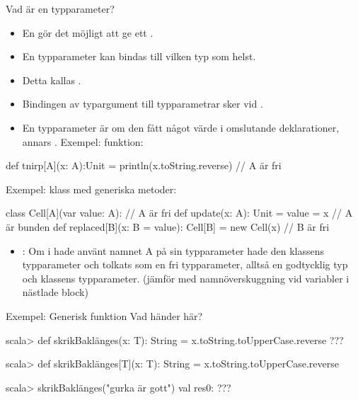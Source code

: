 \begin{Slide}{Vad är en typparameter?}\SlideFontSmall
  \setlength{\leftmargini}{0pt}

\begin{itemize}
\item En  gör det möjligt att ge ett .
\item En  typparameter kan bindas till vilken typ som helst.
\item Detta kallas  .
\item Bindingen av typargument till typparametrar sker vid .
\item En typparameter är  om den  fått något värde i omslutande deklarationer, annars . Exempel:  funktion:
\end{itemize}
\begin{Code}
def tnirp[A](x: A):Unit = println(x.toString.reverse) // A är fri
\end{Code}
\pause
Exempel:  klass med generiska metoder:
\begin{Code}
class Cell[A](var value: A):                            // A är fri
  def update(x: A): Unit = value = x                    // A är bunden
  def replaced[B](x: B = value): Cell[B] = new Cell(x)  // B är fri
\end{Code}
\pause
\begin{itemize}
\item {}: Om  i  hade använt namnet A på sin typparameter hade den  klassens typparameter och tolkats som en  fri typparameter, alltså en godtycklig typ och  klassens typparameter. (jämför med namnöverskuggning vid  variabler i nästlade block)
\end{itemize}

\end{Slide}

\ifkompendium\else
\begin{Slide}{Exempel: Generisk funktion}
Vad händer här?
\begin{REPL}

scala> def skrikBaklänges(x: T): String = x.toString.toUpperCase.reverse
???



scala> def skrikBaklänges[T](x: T): String = x.toString.toUpperCase.reverse

scala> skrikBaklänges("gurka är gott")
val res0: ???

\end{REPL}
\end{Slide}


